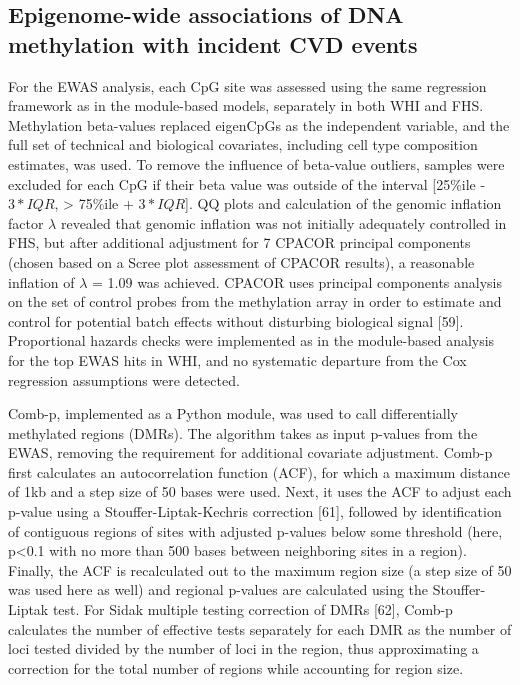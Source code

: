 \documentclass[]{bmcart}
\begin{document}
\subsection{Epigenome-wide associations of DNA methylation with incident
CVD
events}\label{epigenome-wide-associations-of-dna-methylation-with-incident-cvd-events}

For the EWAS analysis, each CpG site was assessed using the same
regression framework as in the module-based models, separately in both
WHI and FHS. Methylation beta-values replaced eigenCpGs as the
independent variable, and the full set of technical and biological
covariates, including cell type composition estimates, was used. To
remove the influence of beta-value outliers, samples were excluded for
each CpG if their beta value was outside of the interval {[}25\%ile -
\(3*IQR\), \textgreater{} 75\%ile + \(3*IQR\){]}. QQ plots and
calculation of the genomic inflation factor \(\lambda\) revealed that
genomic inflation was not initially adequately controlled in FHS, but
after additional adjustment for 7 CPACOR principal components (chosen
based on a Scree plot assessment of CPACOR results), a reasonable
inflation of \(\lambda\) = 1.09 was achieved. CPACOR uses principal
components analysis on the set of control probes from the methylation
array in order to estimate and control for potential batch effects
without disturbing biological signal {[}59{]}. Proportional hazards
checks were implemented as in the module-based analysis for the top EWAS
hits in WHI, and no systematic departure from the Cox regression
assumptions were detected.

Comb-p, implemented as a Python module, was used to call differentially
methylated regions (DMRs). The algorithm takes as input p-values from
the EWAS, removing the requirement for additional covariate adjustment.
Comb-p first calculates an autocorrelation function (ACF), for which a
maximum distance of 1kb and a step size of 50 bases were used. Next, it
uses the ACF to adjust each p-value using a Stouffer-Liptak-Kechris
correction {[}61{]}, followed by identification of contiguous regions of
sites with adjusted p-values below some threshold (here, p\textless{}0.1
with no more than 500 bases between neighboring sites in a region).
Finally, the ACF is recalculated out to the maximum region size (a step
size of 50 was used here as well) and regional p-values are calculated
using the Stouffer-Liptak test. For Sidak multiple testing correction of
DMRs {[}62{]}, Comb-p calculates the number of effective tests
separately for each DMR as the number of loci tested divided by the
number of loci in the region, thus approximating a correction for the
total number of regions while accounting for region size.
\end{document}

